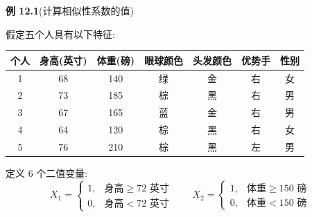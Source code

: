 \noindent\textbf{例 12.1}\quad (计算相似性系数的值)

假定五个人具有以下特征:

\begin{mvtable}
\begin{tabular}{ccccccc}
\toprule
个人 & 身高(英寸) & 体重(磅) & 眼球颜色 & 头发颜色 & 优势手 & 性别\\
\midrule
1 & 68 & 140 & 绿 & 金 & 右 & 女\\
2 & 73 & 185 & 棕 & 黑 & 右 & 男\\
3 & 67 & 165 & 蓝 & 金 & 右 & 男\\
4 & 64 & 120 & 棕 & 黑 & 右 & 女\\
5 & 76 & 210 & 棕 & 黑 & 左 & 男\\
\bottomrule
\end{tabular}
\end{mvtable}

定义 6 个二值变量:
\[
X_1=\begin{cases}
1, & \text{身高}\ge 72 \text{ 英寸}\\
0, & \text{身高}<72 \text{ 英寸}
\end{cases}
\qquad
X_2=\begin{cases}
1, & \text{体重}\ge 150 \text{ 磅}\\
0, & \text{体重}<150 \text{ 磅}
\end{cases}
\]
